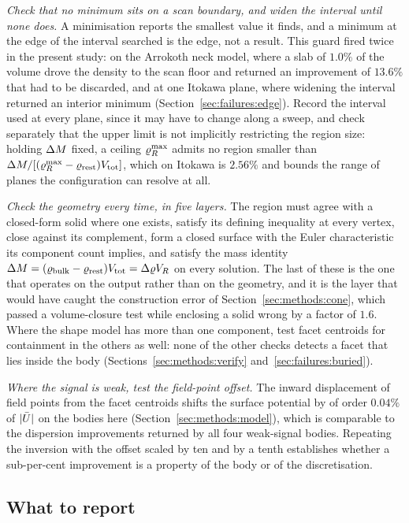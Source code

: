 \emph{Check that no minimum sits on a scan boundary, and widen the interval
until none does.} A minimisation reports the smallest value it finds, and a
minimum at the edge of the interval searched is the edge, not a result. This
guard fired twice in the present study: on the Arrokoth neck model, where a
slab of $1.0\%$ of the volume drove the density to the scan floor and
returned an improvement of $13.6\%$ that had to be discarded, and at one
Itokawa plane, where widening the interval returned an interior minimum
(Section~\ref{sec:failures:edge}). Record the interval used at every plane,
since it may have to change along a sweep, and check separately that the
upper limit is not implicitly restricting the region size: holding $\Delta M$
fixed, a ceiling $\varrho_{R}^{\max}$ admits no region smaller than
$\Delta M/[(\varrho_{R}^{\max}-\varrho_{\mathrm{rest}})V_{\mathrm{tot}}]$, which on Itokawa is $2.56\%$ and
bounds the range of planes the configuration can resolve at all.

\emph{Check the geometry every time, in five layers.} The region must agree
with a closed-form solid where one exists, satisfy its defining inequality
at every vertex, close against its complement, form a closed surface with
the Euler characteristic its component count implies, and satisfy the mass
identity $\Delta M=(\varrho_{\mathrm{bulk}}-\varrho_{\mathrm{rest}})V_{\mathrm{tot}}=\Delta\varrho V_{R}$ on every solution.
The last of these is the one that operates on the output rather than on the
geometry, and it is the layer that would have caught the construction error
of Section~\ref{sec:methods:cone}, which passed a volume-closure test while
enclosing a solid wrong by a factor of $1.6$. Where the shape model has more
than one component, test facet centroids for containment in the others as
well: none of the other checks detects a facet that lies inside the body
(Sections~\ref{sec:methods:verify} and~\ref{sec:failures:buried}).

\emph{Where the signal is weak, test the field-point offset.} The inward
displacement of field points from the facet centroids shifts the surface
potential by of order $0.04\%$ of $\lvert\bar{U}\rvert$ on the bodies here
(Section~\ref{sec:methods:model}), which is comparable to the dispersion
improvements returned by all four weak-signal bodies. Repeating the
inversion with the offset scaled by ten and by a tenth establishes whether a
sub-per-cent improvement is a property of the body or of the discretisation.

\subsection{What to report}
\label{sec:guidelines:report}

